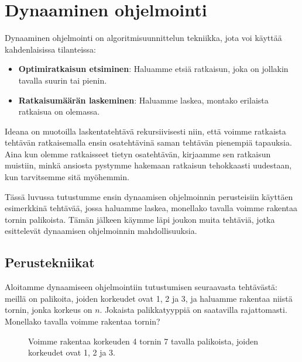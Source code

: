 \chapter{Dynaaminen ohjelmointi}

Dynaaminen ohjelmointi on algoritmisuunnittelun tekniikka,
jota voi käyttää kahdenlaisissa tilanteissa:

\begin{itemize}
\item \textbf{Optimiratkaisun etsiminen}: Haluamme etsiä ratkaisun,
joka on jollakin tavalla suurin tai pienin.
\item \textbf{Ratkaisumäärän laskeminen}: Haluamme laskea,
montako erilaista ratkaisua on olemassa.
\end{itemize}

Ideana on muotoilla laskentatehtävä
rekursiivisesti niin, että voimme ratkaista tehtävän
ratkaisemalla ensin osatehtävinä saman tehtävän pienempiä tapauksia.
Aina kun olemme ratkaisseet tietyn osatehtävän,
kirjaamme sen ratkaisun muistiin, minkä ansiosta
pystymme hakemaan ratkaisun tehokkaasti uudestaan,
kun tarvitsemme sitä myöhemmin.

Tässä luvussa tutustumme ensin dynaamisen ohjelmoinnin perusteisiin
käyttäen esimerkkinä tehtävää, jossa haluamme laskea,
monellako tavalla voimme rakentaa tornin palikoista.
Tämän jälkeen käymme läpi joukon muita tehtäviä, jotka esittelevät
dynaamisen ohjelmoinnin mahdollisuuksia.

\section{Perustekniikat}

Aloitamme dynaamiseen ohjelmointiin tutustumisen
seuraavasta tehtävästä:
meillä on palikoita, joiden korkeudet ovat 1, 2 ja 3,
ja haluamme rakentaa niistä tornin, jonka korkeus on $n$.
Jokaista palikkatyyppiä on saatavilla rajattomasti.
Monellako tavalla voimme rakentaa tornin?

\begin{figure}
\center
{}
\caption{Voimme rakentaa korkeuden 4 tornin 7 tavalla palikoista,
joiden korkeudet ovat 1, 2 ja 3.}
\label{fig:dyntor}
\end{figure}

